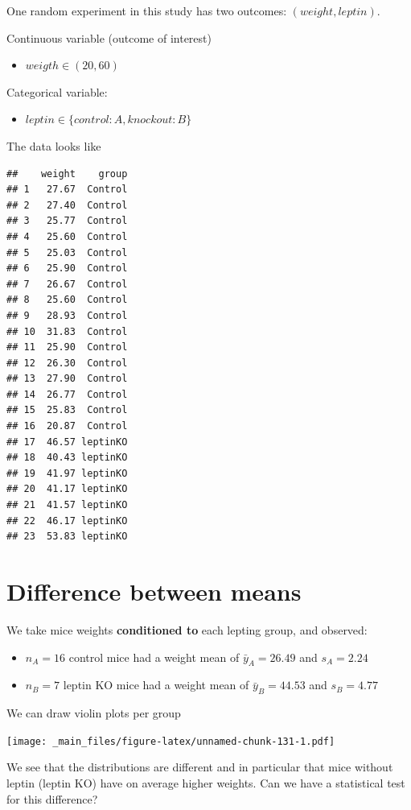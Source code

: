 \documentclass[
]{book}
\providecommand{\tightlist}{%
  \setlength{\itemsep}{0pt}\setlength{\parskip}{0pt}}
\begin{document}
One random experiment in this study has two outcomes: \((weight, leptin)\).

Continuous variable (outcome of interest)

\begin{itemize}
\tightlist
\item
  \(weigth \in (20, 60)\)
\end{itemize}

Categorical variable:

\begin{itemize}
\tightlist
\item
  \(leptin \in \{control:A,knockout:B\}\)
\end{itemize}

The data looks like

\begin{verbatim}
##    weight    group
## 1   27.67  Control
## 2   27.40  Control
## 3   25.77  Control
## 4   25.60  Control
## 5   25.03  Control
## 6   25.90  Control
## 7   26.67  Control
## 8   25.60  Control
## 9   28.93  Control
## 10  31.83  Control
## 11  25.90  Control
## 12  26.30  Control
## 13  27.90  Control
## 14  26.77  Control
## 15  25.83  Control
## 16  20.87  Control
## 17  46.57 leptinKO
## 18  40.43 leptinKO
## 19  41.97 leptinKO
## 20  41.17 leptinKO
## 21  41.57 leptinKO
## 22  46.17 leptinKO
## 23  53.83 leptinKO
\end{verbatim}

\hypertarget{difference-between-means-1}{%
\section{Difference between means}\label{difference-between-means-1}}

We take mice weights \textbf{conditioned to} each lepting group, and observed:

\begin{itemize}
\item
  \(n_A=16\) control mice had a weight mean of \(\bar{y}_A=26.49\) and \(s_A=2.24\)
\item
  \(n_B=7\) leptin KO mice had a weight mean of \(\bar{y}_B=44.53\) and \(s_B=4.77\)
\end{itemize}

We can draw violin plots per group

\texttt{[image: \_main\_files/figure-latex/unnamed-chunk-131-1.pdf]}

We see that the distributions are different and in particular that mice without leptin (leptin KO) have on average higher weights. Can we have a statistical test for this difference?
\end{document}
